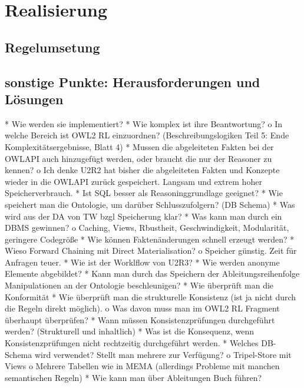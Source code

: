 \chapter{Realisierung}

\section{Regelumsetung}


\section{sonstige Punkte: Herausforderungen und Lösungen}


    
        * Wie werden sie implementiert?
    * Wie komplex ist ihre Beantwortung?
          o In welche Bereich ist OWL2 RL einzuordnen? (Beschreibungslogiken Teil 5: Ende Komplexitätsergebnisse, Blatt 4) 
    * Mussen die abgeleiteten Fakten bei der OWLAPI auch hinzugefügt werden, oder braucht die nur der Reasoner zu kennen?
          o Ich denke U2R2 hat bisher die abgeleiteten Fakten und Konzepte wieder in die OWLAPI zurück gespeichert. Langsam und extrem hoher Speicherverbrauch. 
    * Ist SQL besser als Reasoninggrundlage geeignet?
    * Wie speichert man die Ontologie, um darüber Schlusszufolgern? (DB Schema)
    * Was wird aus der DA von TW bzgl Speicherung klar?
    * Was kann man durch ein DBMS gewinnen?
          o Caching, Views, Rbustheit, Geschwindigkeit, Modularität, geringere Codegröße 
    * Wie können Faktenänderungen schnell erzeugt werden?
    * Wieso Forward Chaining mit Direct Materialisation?
          o Speicher günstig. Zeit für Anfragen teuer. 
    * Wie ist der Worklflow von U2R3?
    * Wie werden anonyme Elemente abgebildet?
    * Kann man durch das Speichern der Ableitungsreihenfolge Manipulationen an der Ontologie beschleunigen?
    * Wie überprüft man die Konformität
    * Wie überprüft man die strukturelle Konsistenz (ist ja nicht durch die Regeln direkt möglich).
          o Was davon muss man im OWL2 RL Fragment überhaupt überprüfen? 
    * Wann müssen Konsistenzprüfungen durchgeführt werden? (Strukturell und inhaltlich)
    * Was ist die Konsequenz, wenn Konsistenzprüfungen nicht rechtzeitig durchgeführt werden.
    * Welches DB-Schema wird verwendet? Stellt man mehrere zur Verfügung?
          o Tripel-Store mit Views
          o Mehrere Tabellen wie in MEMA (allerdings Probleme mit manchen semantischen Regeln) 
    * Wie kann man über Ableitungen Buch führen? 
